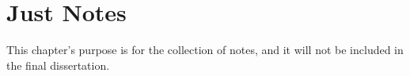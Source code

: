 \chapter*{Just Notes}
This chapter's purpose is for the collection of notes, and it will not be included in the final dissertation.

